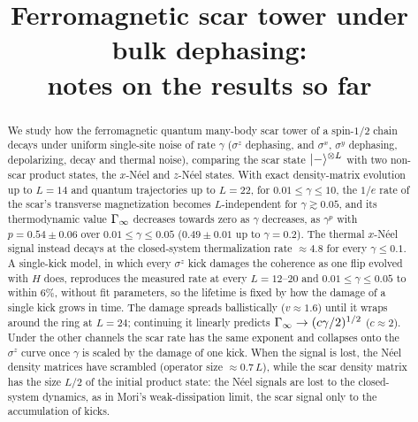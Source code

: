 \documentclass[11pt,a4paper]{article}
\title{Ferromagnetic scar tower under bulk dephasing:\\ notes on the results so far}
\begin{document}
\maketitle

\begin{abstract}
We study how the ferromagnetic quantum many-body scar tower of a spin-$1/2$ chain decays under uniform single-site noise of rate $\gamma$ ($\sigma^z$ dephasing, and $\sigma^x$, $\sigma^y$ dephasing, depolarizing, decay and thermal noise), comparing the scar state $\lvert - \rangle^{\otimes L}$ with two non-scar product states, the $x$-N\'eel and $z$-N\'eel states. With exact density-matrix evolution up to $L = 14$ and quantum trajectories up to $L = 22$, for $0.01 \le \gamma \le 10$, the $1/e$ rate of the scar's transverse magnetization becomes $L$-independent for $\gamma \gtrsim 0.05$, and its thermodynamic value $\Gamma_{\infty}$ decreases towards zero as $\gamma$ decreases, as $\gamma^{p}$ with $p = 0.54 \pm 0.06$ over $0.01 \le \gamma \le 0.05$ ($0.49 \pm 0.01$ up to $\gamma = 0.2$). The thermal $x$-N\'eel signal instead decays at the closed-system thermalization rate $\approx 4.8$ for every $\gamma \le 0.1$. A single-kick model, in which every $\sigma^z$ kick damages the coherence as one flip evolved with $H$ does, reproduces the measured rate at every $L = 12$--$20$ and $0.01 \le \gamma \le 0.05$ to within $6\%$, without fit parameters, so the lifetime is fixed by how the damage of a single kick grows in time. The damage spreads ballistically ($v \approx 1.6$) until it wraps around the ring at $L = 24$; continuing it linearly predicts $\Gamma_{\infty} \to (c\gamma/2)^{1/2}$ ($c \approx 2$). Under the other channels the scar rate has the same exponent and collapses onto the $\sigma^z$ curve once $\gamma$ is scaled by the damage of one kick. When the signal is lost, the N\'eel density matrices have scrambled (operator size $\approx 0.7\,L$), while the scar density matrix has the size $L/2$ of the initial product state: the N\'eel signals are lost to the closed-system dynamics, as in Mori's weak-dissipation limit, the scar signal only to the accumulation of kicks.
\end{abstract}

\tableofcontents



\end{document}
